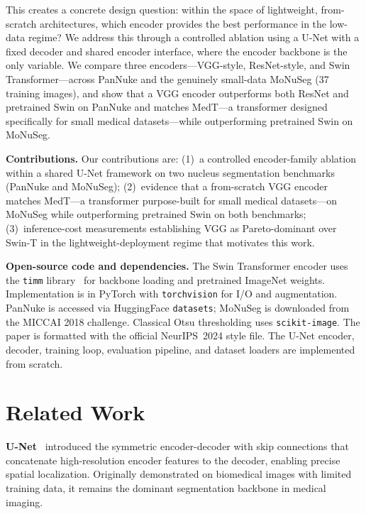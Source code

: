 \documentclass{article}
\begin{document}
This creates a concrete design question: within the space of lightweight, from-scratch architectures, which encoder provides the best performance in the low-data regime? We address this through a controlled ablation using a U-Net with a fixed decoder and shared encoder interface, where the encoder backbone is the only variable. We compare three encoders---VGG-style, ResNet-style, and Swin Transformer---across PanNuke and the genuinely small-data MoNuSeg (37 training images), and show that a VGG encoder outperforms both ResNet and pretrained Swin on PanNuke and matches MedT---a transformer designed specifically for small medical datasets---while outperforming pretrained Swin on MoNuSeg.

\textbf{Contributions.} Our contributions are: (1)~a controlled encoder-family ablation within a shared U-Net framework on two nucleus segmentation benchmarks (PanNuke and MoNuSeg); (2)~evidence that a from-scratch VGG encoder matches MedT---a transformer purpose-built for small medical datasets---on MoNuSeg while outperforming pretrained Swin on both benchmarks; (3)~inference-cost measurements establishing VGG as Pareto-dominant over Swin-T in the lightweight-deployment regime that motivates this work.

\textbf{Open-source code and dependencies.} The Swin Transformer encoder uses the \texttt{timm} library~\cite{rw2019timm} for backbone loading and pretrained ImageNet weights. Implementation is in PyTorch with \texttt{torchvision} for I/O and augmentation. PanNuke is accessed via HuggingFace \texttt{datasets}; MoNuSeg is downloaded from the MICCAI 2018 challenge. Classical Otsu thresholding uses \texttt{scikit-image}. The paper is formatted with the official NeurIPS~2024 style file. The U-Net encoder, decoder, training loop, evaluation pipeline, and dataset loaders are implemented from scratch.

\section{Related Work}

\textbf{U-Net}~\cite{ronneberger2015unet} introduced the symmetric encoder-decoder with skip connections that concatenate high-resolution encoder features to the decoder, enabling precise spatial localization. Originally demonstrated on biomedical images with limited training data, it remains the dominant segmentation backbone in medical imaging.
\end{document}
